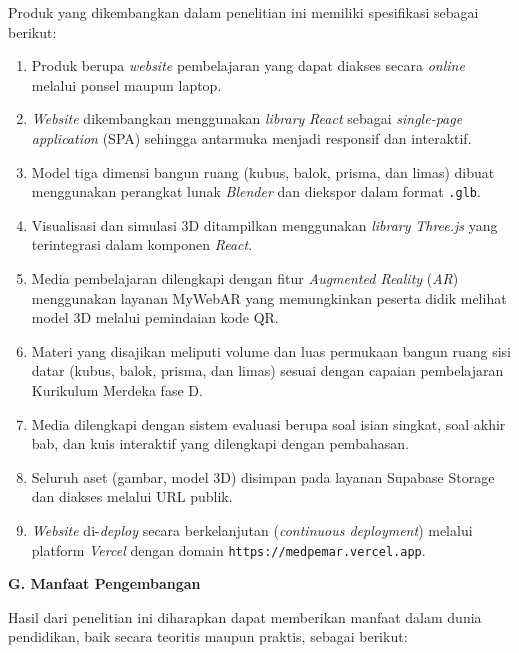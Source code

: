 \hspace*{1cm}Produk yang dikembangkan dalam penelitian ini memiliki spesifikasi sebagai berikut:
\begin{enumerate}
    \item Produk berupa \textit{website} pembelajaran yang dapat diakses secara \textit{online} melalui ponsel maupun laptop.
    \item \textit{Website} dikembangkan menggunakan \textit{library} \textit{React} sebagai \textit{single-page application} (SPA) sehingga antarmuka menjadi responsif dan interaktif.
    \item Model tiga dimensi bangun ruang (kubus, balok, prisma, dan limas) dibuat menggunakan perangkat lunak \textit{Blender} dan diekspor dalam format \texttt{.glb}.
    \item Visualisasi dan simulasi 3D ditampilkan menggunakan \textit{library} \textit{Three.js} yang terintegrasi dalam komponen \textit{React}.
    \item Media pembelajaran dilengkapi dengan fitur \textit{Augmented Reality} (\textit{AR}) menggunakan layanan MyWebAR yang memungkinkan peserta didik melihat model 3D melalui pemindaian kode QR.
    \item Materi yang disajikan meliputi volume dan luas permukaan bangun ruang sisi datar (kubus, balok, prisma, dan limas) sesuai dengan capaian pembelajaran Kurikulum Merdeka fase D.
    \item Media dilengkapi dengan sistem evaluasi berupa soal isian singkat, soal akhir bab, dan kuis interaktif yang dilengkapi dengan pembahasan.
    \item Seluruh aset (gambar, model 3D) disimpan pada layanan Supabase Storage dan diakses melalui URL publik.
    \item \textit{Website} di-\textit{deploy} secara berkelanjutan (\textit{continuous deployment}) melalui platform \textit{Vercel} dengan domain \texttt{https://medpemar.vercel.app}.
\end{enumerate}

\textbf{G. Manfaat Pengembangan}

\hspace*{1cm}Hasil dari penelitian ini diharapkan dapat memberikan manfaat dalam dunia pendidikan, baik secara teoritis maupun praktis, sebagai berikut:

